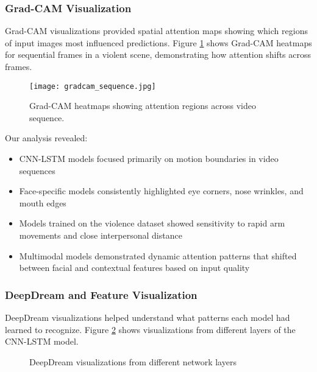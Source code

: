 \documentclass[conference,compsoc]{IEEEtran}
\begin{document}
\subsubsection{Grad-CAM Visualization}
Grad-CAM visualizations provided spatial attention maps showing which regions of input images most influenced predictions. Figure \ref{fig:grad_cam} shows Grad-CAM heatmaps for sequential frames in a violent scene, demonstrating how attention shifts across frames.

\begin{figure}[!t]
\centering
\texttt{[image: gradcam\_sequence.jpg]}
\caption{Grad-CAM heatmaps showing attention regions across video sequence.}
\label{fig:grad_cam}
\end{figure}
\FloatBarrier

Our analysis revealed:
\begin{itemize}
    \item CNN-LSTM models focused primarily on motion boundaries in video sequences
    \item Face-specific models consistently highlighted eye corners, nose wrinkles, and mouth edges
    \item Models trained on the violence dataset showed sensitivity to rapid arm movements and close interpersonal distance
    \item Multimodal models demonstrated dynamic attention patterns that shifted between facial and contextual features based on input quality
\end{itemize}

\subsubsection{DeepDream and Feature Visualization}
DeepDream visualizations helped understand what patterns each model had learned to recognize. Figure \ref{fig:deepdream_layers} shows visualizations from different layers of the CNN-LSTM model.

\begin{figure}[H]
\centering
\begin{minipage}{0.8\textwidth}
\end{minipage}
\caption{DeepDream visualizations from different network layers}
\label{fig:deepdream_layers}
\end{figure}
\end{document}
